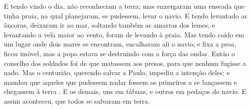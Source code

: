 {  E tendo vindo o dia, não reconheciam a terra; mas enxergaram uma enseada que tinha praia, na qual planejaram, se pudessem, levar o navio.
  E tendo levantado as âncoras, deixaram
{} ir ao mar, soltando também as amarras dos lemes, e levantando a vela maior ao vento, foram de levando
{} à praia.
  Mas tendo caído em um lugar onde dois mares se encontram, encalharam ali o navio; e fixa a proa, ficou imóvel, mas a popa estava se destruindo com a força das ondas.
  Então o conselho dos soldados foi de que matassem aos presos, para que nenhum
{} fugisse a nado.
  Mas o centurião, querendo salvar a Paulo, impediu a intenção deles; e mandou que aqueles que pudessem nadar fossem os primeiros a se lançassem
{} e chegassem à terra
{} .
  E
{} os demais, uns em tábuas, e outros em pedaços do navio. E assim aconteceu, que todos se salvaram em terra.
\par }

